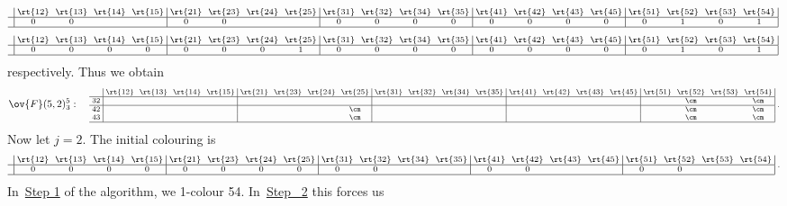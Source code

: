 \begin{exam}
\[\] 
 \vspace{1mm}
 \[ 
\text{\setlength{\arraycolsep}{2.7pt}\scriptsize
$\displaystyle 
\begin{array}{c|cccc|cccc|cccc|cccc|cccc|}
 &\rt{12}&\rt{13}&\rt{14}&\rt{15}&\rt{21} &\rt{23}&\rt{24}&\rt{25}&\rt{31}&\rt{32} &\rt{34}&\rt{35}&\rt{41}&\rt{42}&\rt{43} &\rt{45} 
 &\rt{51}&\rt{52}&\rt{53} &\rt{54} \\ \hline 
 &0&0&		&	&0&0&&	&0	&0&0&0	&0	&0&0&0	&0&1&0&1			\\ 
 \hline
\end{array}\; $} 
\] \vspace{1mm}
 \[ 
\text{\setlength{\arraycolsep}{2.7pt}\scriptsize
$\displaystyle 
\begin{array}{c|cccc|cccc|cccc|cccc|cccc|}
 &\rt{12}&\rt{13}&\rt{14}&\rt{15}&\rt{21} &\rt{23}&\rt{24}&\rt{25}&\rt{31}&\rt{32} &\rt{34}&\rt{35}&\rt{41}&\rt{42}&\rt{43} &\rt{45} 
 &\rt{51}&\rt{52}&\rt{53} &\rt{54} \\ \hline 
 &0&0&0		&0	&0&0&0&1	&0	&0&0&0	&0	&0&0&0	&0&1&0&1			\\ 
 \hline
\end{array}\;$} 
\]
respectively. Thus we obtain 
\[ \ov{F}(5,2)^5_3: \quad
\text{\setlength{\arraycolsep}{2.7pt}\scriptsize
$\displaystyle 
\begin{array}{c|cccc|cccc|cccc|cccc|cccc|}
 &\rt{12}&\rt{13}&\rt{14}&\rt{15}&\rt{21} &\rt{23}&\rt{24}&\rt{25}&\rt{31}&\rt{32} &\rt{34}&\rt{35}&\rt{41}&\rt{42}&\rt{43} &\rt{45} 
 &\rt{51}&\rt{52}&\rt{53} &\rt{54} \\ \hline 
 32 	&&&&			&&&&			&& &	&&& &	&		&&\cm&&\cm							\\ \hline
 42 	&&&&			&&&&\cm			&& && && &	&		&&\cm&&\cm				\\ 
 43 	&&&&			&&&&\cm			&& && && &	&		&&\cm&&\cm							\\ 
 \hline
\end{array}\; .$}
\]
Now let $j=2$. The initial colouring is
 \[ 
 \text{\setlength{\arraycolsep}{2.7pt}\scriptsize
$\displaystyle 
\begin{array}{c|cccc|cccc|cccc|cccc|cccc|}
 &\rt{12}&\rt{13}&\rt{14}&\rt{15}&\rt{21} &\rt{23}&\rt{24}&\rt{25}&\rt{31}&\rt{32} &\rt{34}&\rt{35}&\rt{41}&\rt{42}&\rt{43} &\rt{45} 
 &\rt{51}&\rt{52}&\rt{53} &\rt{54} \\ \hline 
 &0&0&0&0	
 &0&0&0&0	
 &0&0&&						 
 &0&0&&
 &0&0&& 	\\ \hline
\end{array}\;.$} 
\] 
In~\hyperlink{prop6.13_S1}{Step 1} of the algorithm, we 1-colour 54. In~\hyperlink{prop6.13_S2}{Step~ 2} this forces us

\end{exam}

